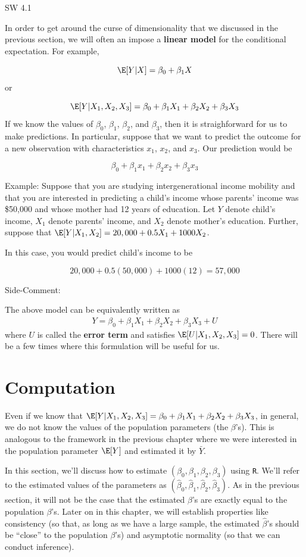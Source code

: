 \documentclass[
  letterpaper,
  DIV=11,
  numbers=noendperiod]{scrreprt}
\begin{document}
SW 4.1

In order to get around the curse of dimensionality that we discussed in
the previous section, we will often an impose a \textbf{linear model}
for the conditional expectation. For example,

\[
  \E[Y|X] = \beta_0 + \beta_1 X
\] or

\[
  \E[Y|X_1,X_2,X_3] = \beta_0 + \beta_1 X_1 + \beta_2 X_2 + \beta_3 X_3
\] If we know the values of \(\beta_0\), \(\beta_1\), \(\beta_2\), and
\(\beta_3\), then it is straighforward for us to make predictions. In
particular, suppose that we want to predict the outcome for a new
observation with characteristics \(x_1\), \(x_2\), and \(x_3\). Our
prediction would be

\[
  \beta_0 + \beta_1 x_1 + \beta_2 x_2 + \beta_3 x_3
\]

{Example: }Suppose that you are studying intergenerational income
mobility and that you are interested in predicting a child's income
whose parents' income was \$50,000 and whose mother had 12 years of
education. Let \(Y\) denote child's income, \(X_1\) denote parents'
income, and \(X_2\) denote mother's education. Further, suppose that
\(\E[Y|X_1,X_2] = 20,000 + 0.5 X_1 + 1000 X_2\).

In this case, you would predict child's income to be

\[
  20,000 + 0.5 (50,000) + 1000(12) = 57,000
\]

{Side-Comment:}

The above model can be equivalently written as \begin{align*}
  Y = \beta_0 + \beta_1 X_1 + \beta_2 X_2 + \beta_3 X_3 + U
\end{align*} where \(U\) is called the \textbf{error term} and satisfies
\(\E[U|X_1,X_2,X_3] = 0\). There will be a few times where this
formulation will be useful for us.

\section{Computation}\label{computation}

Even if we know that
\(\E[Y|X_1,X_2,X_3] = \beta_0 + \beta_1 X_1 + \beta_2 X_2 + \beta_3 X_3\),
in general, we do not know the values of the population parameters (the
\(\beta\)'s). This is analogous to the framework in the previous chapter
where we were interested in the population parameter \(\E[Y]\) and
estimated it by \(\bar{Y}\).

In this section, we'll discuss how to estimate
\((\beta_0,\beta_1,\beta_2,\beta_3)\) using \texttt{R}. We'll refer to
the estimated values of the parameters as
\((\hat{\beta}_0, \hat{\beta}_1, \hat{\beta}_2, \hat{\beta}_3)\). As in
the previous section, it will not be the case that the estimated
\(\hat{\beta}\)'s are exactly equal to the population \(\beta\)'s. Later
on in this chapter, we will establish properties like consistency (so
that, as long as we have a large sample, the estimated \(\hat{\beta}\)'s
should be ``close'' to the population \(\beta\)'s) and asymptotic
normality (so that we can conduct inference).
\end{document}
